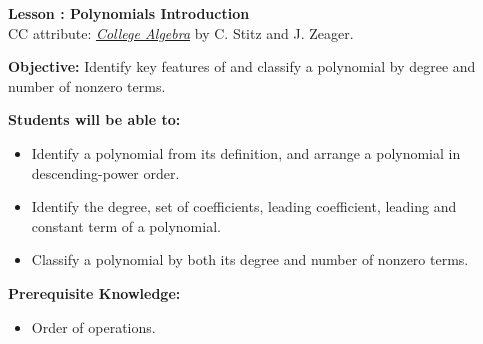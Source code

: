 \documentclass[12pt]{article}
\theoremstyle{definition}
\begin{document}
{\bf \large Lesson : Polynomials Introduction}
\\ CC attribute: \href{http://www.stitz-zeager.com}{\it{College Algebra}} by C. Stitz and J. Zeager. 
\hfill \doclicenseImage[imagewidth=5em]\\
\par
{\bf Objective:} Identify key features of and classify a polynomial by degree and number of nonzero terms.\\
\par
{\bf Students will be able to:}
\begin{itemize}
	\item Identify a polynomial from its definition, and arrange a polynomial in descending-power order.
	\item Identify the degree, set of coefficients, leading coefficient, leading and constant term of a polynomial.
	\item Classify a polynomial by both its degree and number of nonzero terms.
\end{itemize}
{\bf Prerequisite Knowledge:}
\begin{itemize}
	\item Order of operations.
\end{itemize}
\hrulefill
\end{document}
